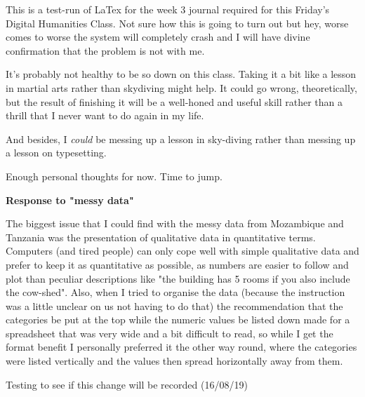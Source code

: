 \documentclass{article}
\begin{document}
This is a test-run of LaTex for the week 3 journal required for this Friday's Digital Humanities Class. Not sure how this is going to turn out but hey, worse comes to worse the system will completely crash and I will have divine confirmation that the problem is not with me.

It's probably not healthy to be so down on this class. Taking it a bit like a lesson in martial arts rather than skydiving might help. It could go wrong, theoretically, but the result of finishing it will be a well-honed and useful skill rather than a thrill that I never want to do again in my life.

And besides, I \textit{could} be messing up a lesson in sky-diving rather than messing up a lesson on typesetting.

Enough personal thoughts for now. Time to jump.

\textbf{Response to "messy data"}

The biggest issue that I could find with the messy data from Mozambique and Tanzania was the presentation of qualitative data in quantitative terms. Computers (and tired people) can only cope well with simple qualitative data and prefer to keep it as quantitative as possible, as numbers are easier to follow and plot than peculiar descriptions like "the building has 5 rooms if you also include the cow-shed". Also, when I tried to organise the data (because the instruction was a little unclear on us not having to do that) the recommendation that the categories be put at the top while the numeric values be listed down made for a spreadsheet that was very wide and a bit difficult to read, so while I get the format benefit I personally preferred it the other way round, where the categories were listed vertically and the values then spread horizontally away from them.

Testing to see if this change will be recorded (16/08/19)
\end{document}
